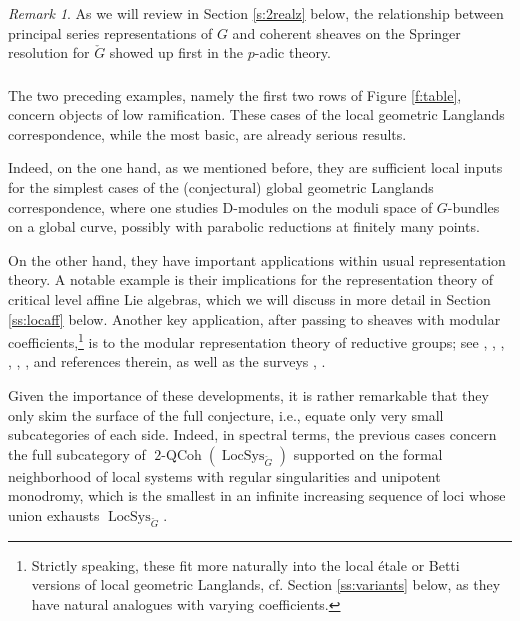 \documentclass[10pt]{amsart}
\newcommand{\TwoCoh}{\on{2-QCoh}}
\newcommand{\LS}{\on{LocSys}_{\cG}}
\newcommand{\on}{\operatorname}
\theoremstyle{remark}
\newtheorem{re}[subsubsection]{Remark}
\numberwithin{equation}{section}
\newcommand{\cG}{\check{G}}
\begin{document}
	
	
	
	\begin{re} As we will review in Section \ref{s:2realz} below, the relationship 
	between principal series representations of $G$ and coherent sheaves on 
	the Springer resolution for $\cG$ showed up first in the $p$-adic theory. 
	\end{re}
	
	
	
	\subsubsection{} The two preceding examples, namely the first two rows 
	of Figure \ref{f:table}, concern objects of low ramification. These cases 
	of the local geometric Langlands correspondence, while the most basic,  
	are already serious results. 
	
	Indeed, on the one hand, as we mentioned 
	before, they are sufficient local inputs for the simplest cases of the 
	(conjectural) global geometric 	Langlands correspondence,  where one 
	studies D-modules on the moduli space of $G$-bundles on a global curve, possibly with 
	parabolic reductions at finitely many points.
	
	
	On the other hand, they have important applications within usual 
	representation theory. A notable example is their implications for the  
	representation theory of critical level affine Lie algebras, which we will 
	discuss in more detail in Section \ref{ss:locaff} below. Another key application, after passing to sheaves with modular coefficients,\footnote{Strictly speaking, these fit more naturally into the local \'{e}tale or Betti versions of local geometric Langlands, cf. Section \ref{ss:variants} below, as they have natural analogues with varying coefficients.} is to the modular representation theory of 
	reductive groups; see \cite{finkelbergmirkovicconjecture}, \cite{mirkovic-vilonen}, \cite{acharrider}, \cite{richewilliamsontilting}, \cite{bezgaitsmiriwahotiwhittaker}, \cite{bezricheriderregcentralizer}, \cite{bezricheprinblock} and references therein, as well as the surveys \cite{willimasonsurvey1}, \cite{williamsonsurvey2}. 
	
	
Given the importance of these developments, it is rather remarkable that they 
only skim the surface of the full conjecture, i.e., equate only very small 
subcategories of each side. Indeed, in spectral 
	terms, the previous cases concern the full subcategory of $\TwoCoh(\LS)$ 
	supported on 
	the formal neighborhood of local systems with regular singularities and 
	unipotent monodromy, which is the smallest in an infinite increasing sequence of loci whose union exhausts $\LS$.  
	
\end{document}
